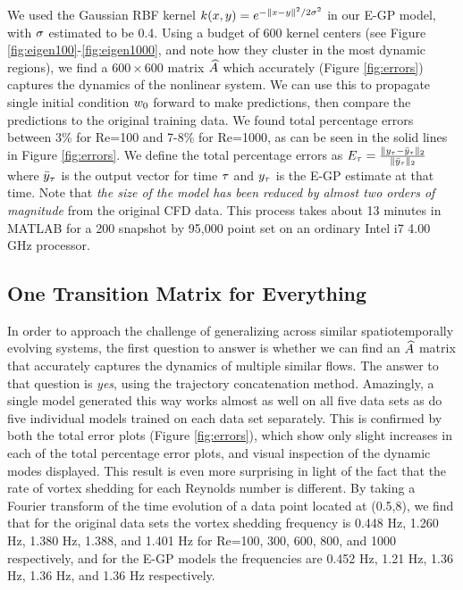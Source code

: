 We used the Gaussian RBF kernel $k(x,y) = e^{-\|x-y\|^2/2\sigma^2}$ in our E-GP model, with $\sigma$ estimated to be 0.4. Using a budget of 600 kernel centers (see Figure \ref{fig:eigen100}-\ref{fig:eigen1000}, and note how they cluster in the most dynamic regions), we find a $600\times600$ matrix $\widehat{A}$ which accurately (Figure \ref{fig:errors}) captures the dynamics of the nonlinear system. We can use this to propagate single initial condition $w_{0}$ forward to make predictions, then compare the predictions to the original training data. We found total percentage errors between 3\% for Re=100 and 7-8\% for Re=1000, as can be seen in the solid lines in Figure \ref{fig:errors}. We define the total percentage errors as
$E_\tau = \frac{\|y_\tau-\bar y_\tau\|_2}{\|\bar y_\tau\|_2}$
where $\bar y_\tau$ is the output vector for time $\tau$ and $y_\tau$ is the E-GP estimate at that time. Note that \emph{the size of the model has been reduced by almost two orders of magnitude} from the original CFD data. This process takes about 13 minutes in MATLAB for a 200 snapshot by 95,000 point set on an ordinary Intel i7 4.00 GHz processor.

\subsection{One Transition Matrix for Everything}\label{sec:lotr}

In order to approach the challenge of generalizing across similar spatiotemporally evolving systems, the first question to answer is whether we can find an $\widehat{A}$ matrix that accurately captures the dynamics of multiple similar flows. The answer to that question is \textit{yes}, using the trajectory concatenation method. Amazingly, a single model generated this way works almost as well on all five data sets as do five individual models trained on each data set separately. This is confirmed by both the total error plots (Figure \ref{fig:errors}), which show only slight increases in each of the total percentage error plots, and visual inspection of the dynamic modes displayed. This result is even more surprising in light of the fact that the rate of vortex shedding for each Reynolds number is different. By taking a Fourier transform of the time evolution of a data point located at (0.5,8), we find that for the original data sets the vortex shedding frequency is 0.448 Hz, 1.260 Hz, 1.380 Hz, 1.388, and 1.401 Hz for Re=100, 300, 600, 800, and 1000 respectively, and for the E-GP models the frequencies are 0.452 Hz, 1.21 Hz, 1.36 Hz, 1.36 Hz, and 1.36 Hz respectively.

